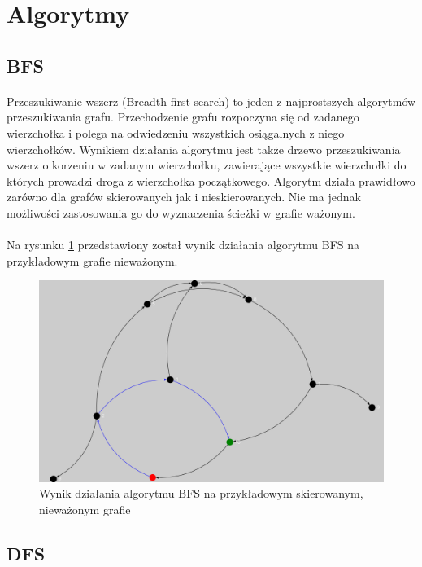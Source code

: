 \section{Algorytmy}

\subsection{BFS}
\paragraph{}
Przeszukiwanie wszerz (Breadth-first search) to jeden z najprostszych algorytmów przeszukiwania grafu. 
Przechodzenie grafu rozpoczyna się od zadanego wierzchołka i polega na odwiedzeniu wszystkich osiągalnych z niego wierzchołków. 
Wynikiem działania algorytmu jest także drzewo przeszukiwania wszerz o korzeniu w zadanym wierzchołku, zawierające wszystkie wierzchołki do których
prowadzi droga z wierzchołka początkowego. 
Algorytm działa prawidłowo zarówno dla grafów skierowanych jak i nieskierowanych.
Nie ma jednak możliwości zastosowania go do wyznaczenia ścieżki w grafie ważonym.

\paragraph{}
Na rysunku \ref{fig:bfs} przedstawiony został wynik działania algorytmu BFS na przykładowym grafie nieważonym.

\begin{figure}[!h]
 \centering
 \includegraphics[width=1.0\textwidth]{algorithms/bfs}
 \caption{Wynik działania algorytmu BFS na przykładowym skierowanym, nieważonym grafie}
 \label{fig:bfs}
\end{figure}

\subsection{DFS}
